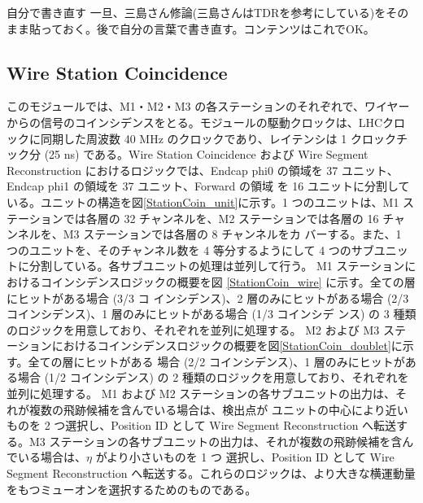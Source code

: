 \begin{itembox}{自分で書き直す}
    一旦、三島さん修論(三島さんはTDRを参考にしている)をそのまま貼っておく。後で自分の言葉で書き直す。コンテンツはこれでOK。
\end{itembox}

\subsection*{Wire Station Coincidence}

このモジュールでは、M1・M2・M3 の各ステーションのそれぞれで、ワイヤーからの信号のコインシデンスをとる。モジュールの駆動クロックは、LHCクロックに同期した周波数 40 MHz のクロックであり、レイテンシは 1 クロックチック分 (25 ns) である。Wire Station Coincidence および Wire Segment Reconstruction におけるロジックでは、Endcap phi0 の領域を 37 ユニット、Endcap phi1 の領域を 37 ユニット、Forward の領域 を 16 ユニットに分割している。ユニットの構造を図\ref{StationCoin_unit}に示す。1 つのユニットは、M1 ステーションでは各層の 32 チャンネルを、M2 ステーションでは各層の 16 チャンネルを、M3 ステーションでは各層の 8 チャンネルをカ バーする。また、1 つのユニットを、そのチャンネル数を 4 等分するようにして 4 つのサブユニットに分割している。各サブユニットの処理は並列して行う。
M1 ステーションにおけるコインシデンスロジックの概要を図 \ref{StationCoin_wire} に示す。全ての層にヒットがある場合 (3/3 コ インシデンス)、2 層のみにヒットがある場合 (2/3 コインシデンス)、1 層のみにヒットがある場合 (1/3 コインシデ ンス) の 3 種類のロジックを用意しており、それぞれを並列に処理する。
M2 および M3 ステーションにおけるコインシデンスロジックの概要を図\ref{StationCoin_doublet}に示す。全ての層にヒットがある 場合 (2/2 コインシデンス)、1 層のみにヒットがある場合 (1/2 コインシデンス) の 2 種類のロジックを用意しており、それぞれを並列に処理する。
M1 および M2 ステーションの各サブユニットの出力は、それが複数の飛跡候補を含んでいる場合は、検出点が ユニットの中心により近いものを 2 つ選択し、Position ID として Wire Segment Reconstruction へ転送する。M3 ステーションの各サブユニットの出力は、それが複数の飛跡候補を含んでいる場合は、$\eta$ がより小さいものを 1 つ 選択し、Position ID として Wire Segment Reconstruction へ転送する。これらのロジックは、より大きな横運動量 をもつミューオンを選択するためのものである。

